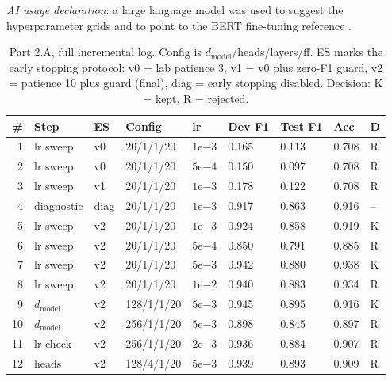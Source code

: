 \documentclass[a4paper]{article}
\begin{document}
{\footnotesize\noindent\textit{AI usage declaration}: a large language model was used to suggest the hyperparameter grids and to point to the {BERT} fine-tuning reference \cite{devlin2019bert}.\par}

\clearpage

\begin{table}[t]
  \centering
  \caption{Part 2.A, full incremental log. Config is $d_{\mathrm{model}}$/heads/layers/ff. ES marks the early stopping protocol: v0 = lab patience 3, v1 = v0 plus zero-F1 guard, v2 = patience 10 plus guard (final), diag = early stopping disabled. Decision: K = kept, R = rejected.}
  \label{tab:parta}
  \scriptsize
  \setlength{\tabcolsep}{3.5pt}
  \begin{tabular}{@{}rllllllll@{}}
    \toprule
    \# & Step & ES & Config & lr & Dev F1 & Test F1 & Acc & D \\
    \midrule
    1  & lr sweep    & v0   & 20/1/1/20   & $1\mathrm{e}{-3}$ & 0.165 & 0.113 & 0.708 & R \\
    2  & lr sweep    & v0   & 20/1/1/20   & $5\mathrm{e}{-4}$ & 0.150 & 0.097 & 0.708 & R \\
    3  & lr sweep    & v1   & 20/1/1/20   & $1\mathrm{e}{-3}$ & 0.178 & 0.122 & 0.708 & R \\
    4  & diagnostic  & diag & 20/1/1/20   & $1\mathrm{e}{-3}$ & 0.917 & 0.863 & 0.916 & -- \\
    5  & lr sweep    & v2   & 20/1/1/20   & $1\mathrm{e}{-3}$ & 0.924 & 0.858 & 0.919 & K \\
    6  & lr sweep    & v2   & 20/1/1/20   & $5\mathrm{e}{-4}$ & 0.850 & 0.791 & 0.885 & R \\
    7  & lr sweep    & v2   & 20/1/1/20   & $5\mathrm{e}{-3}$ & 0.942 & 0.880 & 0.938 & K \\
    8  & lr sweep    & v2   & 20/1/1/20   & $1\mathrm{e}{-2}$ & 0.940 & 0.883 & 0.934 & R \\
    9  & $d_{\mathrm{model}}$ & v2 & 128/1/1/20 & $5\mathrm{e}{-3}$ & 0.945 & 0.895 & 0.916 & K \\
    10 & $d_{\mathrm{model}}$ & v2 & 256/1/1/20 & $5\mathrm{e}{-3}$ & 0.898 & 0.845 & 0.897 & R \\
    11 & lr check    & v2   & 256/1/1/20  & $2\mathrm{e}{-3}$ & 0.936 & 0.884 & 0.907 & R \\
    12 & heads       & v2   & 128/4/1/20  & $5\mathrm{e}{-3}$ & 0.939 & 0.893 & 0.909 & R \\

\end{tabular}
\end{table}
\end{document}
